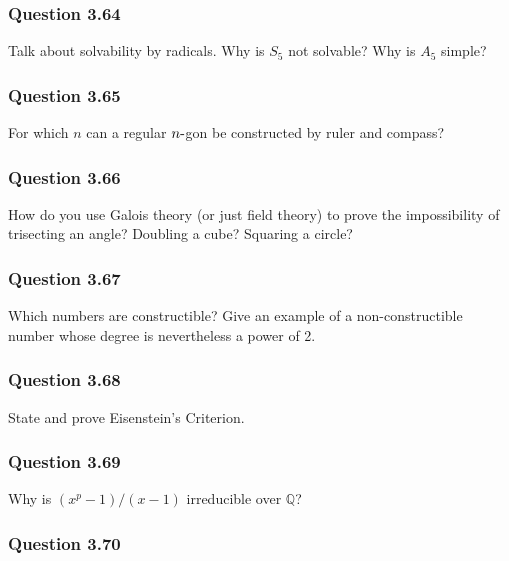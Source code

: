 \hypertarget{question-3.64}{%
\subsubsection{Question 3.64}\label{question-3.64}}

Talk about solvability by radicals. Why is \(S_5\) not solvable? Why is
\(A_5\) simple?

\hypertarget{question-3.65}{%
\subsubsection{Question 3.65}\label{question-3.65}}

For which \(n\) can a regular \(n{\hbox{-}}\)gon be constructed by ruler
and compass?

\hypertarget{question-3.66}{%
\subsubsection{Question 3.66}\label{question-3.66}}

How do you use Galois theory (or just field theory) to prove the
impossibility of trisecting an angle? Doubling a cube? Squaring a
circle?

\hypertarget{question-3.67}{%
\subsubsection{Question 3.67}\label{question-3.67}}

Which numbers are constructible? Give an example of a non-constructible
number whose degree is nevertheless a power of 2.

\hypertarget{question-3.68}{%
\subsubsection{Question 3.68}\label{question-3.68}}

State and prove Eisenstein's Criterion.

\hypertarget{question-3.69}{%
\subsubsection{Question 3.69}\label{question-3.69}}

Why is \((x^p - 1)/(x - 1)\) irreducible over \({\mathbb{Q}}\)?

\hypertarget{question-3.70}{%
\subsubsection{Question 3.70}\label{question-3.70}}

